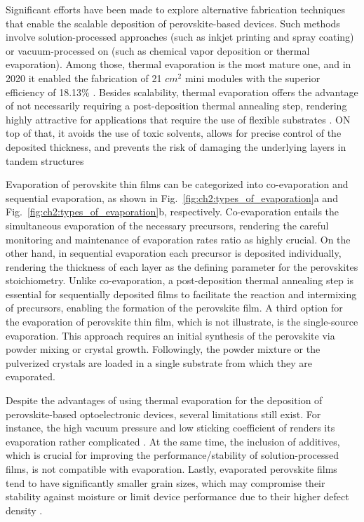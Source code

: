 Significant efforts have been made to explore alternative fabrication techniques that enable the scalable deposition of perovskite-based devices. Such methods involve solution-processed approaches (such as inkjet printing and spray coating) or vacuum-processed on (such as chemical vapor deposition or thermal evaporation). Among those, thermal evaporation is the most mature one, and in 2020 it enabled the fabrication of 21 $cm^2$ mini modules with the superior efficiency of 18.13\% \cite{Vaynzof2020TheProcessing, Li2020HighlyMini-modules}. Besides scalability, thermal evaporation offers the advantage of not necessarily requiring a post-deposition thermal annealing step, rendering highly attractive for applications that require the use of flexible substrates \cite{Becker2019LowExperimentation}. ON top of that, it avoids the use of toxic solvents, allows for precise control of the deposited thickness, and prevents the risk of damaging the underlying layers in tandem structures \cite{Zhang2020TowardCells, Forgacs2017EfficientCells}

Evaporation of perovskite thin films can be categorized into co-evaporation and sequential evaporation, as shown in Fig.~\ref{fig:ch2:types_of_evaporation}a and Fig.~\ref{fig:ch2:types_of_evaporation}b, respectively. Co-evaporation entails the simultaneous evaporation of the necessary precursors, rendering the careful monitoring and maintenance of evaporation rates ratio as highly crucial. On the other hand, in sequential evaporation each precursor is deposited individually, rendering the thickness of each layer as the defining parameter for the perovskites stoichiometry. Unlike co-evaporation, a post-deposition thermal annealing step is essential for sequentially deposited films to facilitate the reaction and intermixing of precursors, enabling the formation of the perovskite film. A third option for the evaporation of perovskite thin film, which is not illustrate, is the single-source evaporation. This approach requires an initial synthesis of the perovskite via powder mixing or crystal growth. Followingly, the powder mixture or the pulverized crystals are loaded in a single substrate from which they are evaporated. 


Despite the advantages of using thermal evaporation for the deposition of perovskite-based optoelectronic devices, several limitations still exist. For instance, the high vacuum pressure and low sticking coefficient of  renders its evaporation rather complicated \cite{Kim2020DepositionCH3NH3PbI3Perovskite}. At the same time, the inclusion of additives, which is crucial for improving the performance/stability of solution-processed films, is not compatible with evaporation. Lastly, evaporated perovskite films tend to have significantly smaller grain sizes, which may compromise their stability against moisture or limit device performance due to their higher defect density \cite{Vaynzof2020TheProcessing, Wang2017Scaling}.


